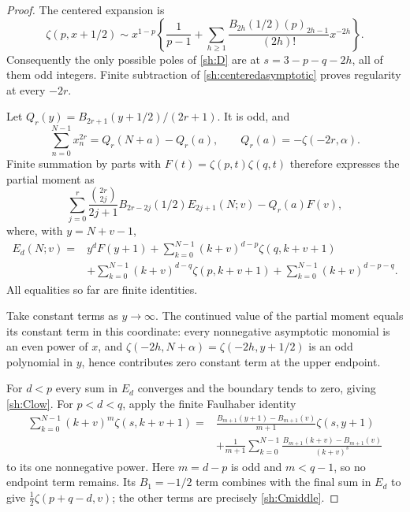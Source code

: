 \begin{proof}
The centered expansion is
\begin{equation}\label{sh:centeredasymptotic}
 \zeta(p,x+1/2)\sim x^{1-p}
 \left\{\frac1{p-1}+\sum_{h\ge1}
   \frac{B_{2h}(1/2)(p)_{2h-1}}{(2h)!}x^{-2h}\right\}.
\end{equation}
Consequently the only possible poles of \eqref{sh:D} are at
$s=3-p-q-2h$, all of them odd integers.  Finite subtraction of
\eqref{sh:centeredasymptotic} proves regularity at every $-2r$.

Let $Q_r(y)=B_{2r+1}(y+1/2)/(2r+1)$.  It is odd, and
\[
 \sum_{n=0}^{N-1}x_n^{2r}=Q_r(N+a)-Q_r(a),\qquad
 Q_r(a)=-\zeta(-2r,\alpha).
\]
Finite summation by parts with
$F(t)=\zeta(p,t)\zeta(q,t)$ therefore expresses the partial
moment as
\begin{equation}\label{sh:finiteEtransform}
 \sum_{j=0}^r
   \frac{\binom{2r}{2j}}{2j+1}B_{2r-2j}(1/2)
        E_{2j+1}(N;v)-Q_r(a)F(v),
\end{equation}
where, with $y=N+v-1$,
\begin{align*}
 E_d(N;v)={}&y^dF(y+1)
  +\sum_{k=0}^{N-1}(k+v)^{d-p}\zeta(q,k+v+1)\\
 &+\sum_{k=0}^{N-1}(k+v)^{d-q}\zeta(p,k+v+1)
  +\sum_{k=0}^{N-1}(k+v)^{d-p-q}.
\end{align*}
All equalities so far are finite identities.

Take constant terms as $y\to\infty$.  The continued value of the
partial moment equals its constant term in this coordinate: every
nonnegative asymptotic monomial is an even power of $x$, and
$\zeta(-2h,N+\alpha)=\zeta(-2h,y+1/2)$ is an odd polynomial in
$y$, hence contributes zero constant term at the upper endpoint.

For $d<p$ every sum in $E_d$ converges and the boundary tends to
zero, giving \eqref{sh:Clow}.  For $p<d<q$, apply the finite
Faulhaber identity
\begin{align*}
 \sum_{k=0}^{N-1}(k+v)^m\zeta(s,k+v+1)
 ={}&\frac{B_{m+1}(y+1)-B_{m+1}(v)}{m+1}\zeta(s,y+1)\\
 &+\frac1{m+1}\sum_{k=0}^{N-1}
      \frac{B_{m+1}(k+v)-B_{m+1}(v)}{(k+v)^s}
\end{align*}
to its one nonnegative power.  Here $m=d-p$ is odd and
$m<q-1$, so no endpoint term remains.  Its $B_1=-1/2$ term
combines with the final sum in $E_d$ to give
$\tfrac12\zeta(p+q-d,v)$; the other terms are precisely
\eqref{sh:Cmiddle}.


\end{proof}
